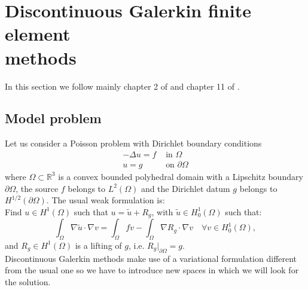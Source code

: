 \documentclass[12pt, a4paper]{article}
\theoremstyle{definition}
\theoremstyle{plain}
\theoremstyle{plain}
\theoremstyle{definition}
\begin{document}

\section[Discontinuous Galerkin finite element methods]{Discontinuous Galerkin 
finite element\\methods}\label{sec:DG}
In this section we follow mainly chapter 2 of \cite{riviere} and chapter 11 of \cite{quart}.
\subsection{Model problem}
Let us consider a Poisson problem with Dirichlet boundary conditions
\begin{align} \label{eq:poisson}
	-\Delta u = f & \mbox{ in } \Omega\\
			u = g & \mbox{ on } \partial \Omega
\end{align}
where $\Omega \subset \mathbb{R}^3$ is a convex bounded polyhedral domain with 
a Lipschitz boundary $\partial \Omega$, the source $f$ belongs to $L^2(\Omega)$ 
and the Dirichlet datum $g$ belongs to $H^{1/2}(\partial \Omega)$.
The usual weak formulation is:\\
Find $u \in H^1(\Omega)$ such that $u = \tilde{u} + R_g$, with $\tilde{u} \in H^1_0(\Omega)$ such that:
\begin{equation} \label{eq:wform}
	\int_\Omega \nabla \tilde{u} \cdot \nabla v
	= \int_\Omega fv - \int_\Omega \nabla R_g \cdot \nabla v \quad \forall v 
	\in H^1_0(\Omega),
\end{equation}
and $R_g \in H^1(\Omega)$ is a lifting of $g$, i.e. $R_g|_{\partial \Omega} = g$.\\
Discontinuous Galerkin methods make use of a variational formulation different 
from the usual one so we have to introduce new spaces in which we will look for 
the solution.
\end{document}
